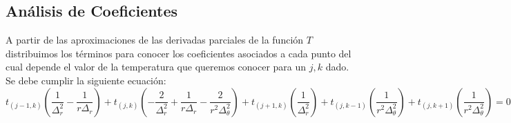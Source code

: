 
\subsection{Análisis de Coeficientes}
A partir de las aproximaciones de las derivadas parciales de la función $T$ distribuimos los términos para conocer los coeficientes asociados a cada punto del cual depende el valor de la temperatura que queremos conocer para un $j,k$ dado. Se debe cumplir la siguiente ecuación: \\
$$t_{(j-1, k)} (\frac{1}{\Delta^2_r}-\frac{1}{r \Delta_r}) +
t_{(j, k)} (-\frac{2}{\Delta^2_r}+\frac{1}{r \Delta_r}-\frac{2}{r^2 \Delta^2_\theta}) + 
t_{(j+1, k)} (\frac{1}{\Delta^2_r}) + 
t_{(j, k-1)} (\frac{1}{r^2 \Delta^2_\theta}) +
t_{(j, k+1)} (\frac{1}{r^2 \Delta^2_\theta}) = 0 $$ \\


